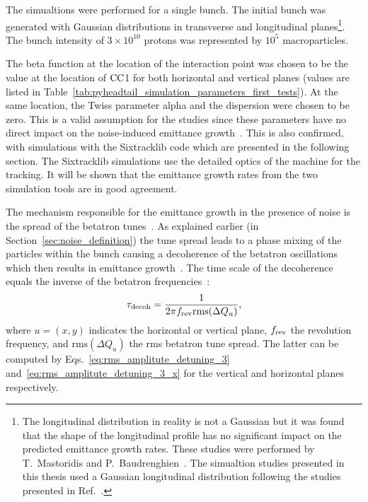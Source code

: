 The simualtions were performed for a single bunch. The initial bunch was generated with Gaussian distributions in transvserse and longitudinal planes\footnote{The longitudinal distribution in reality is not a Gaussian but it was found that the shape of the longitudinal profile has no significant impact on the predicted emittance growth rates. These studies were performed by T.~Mastoridis and P.~Baudrenghien~\cite{Themis_philippe_personal_communication}. The simualtion studies presented in this thesis used a Gaussian longitudinal distribution following the studies presented in Ref.~\cite{PhysRevSTAB.18.101001}.}.
The bunch intensity of $3\times 10^{10}$ protons was represented by $10^5$ macroparticles. 

The beta function at the location of the interaction point was chosen to be the value at the location of ${\mathrm{CC}}$1 for both horizontal and vertical planes (values are listed in Table~\ref{tab:pyheadtail_simulation_parameters_first_tests}). At the same location, the Twiss parameter alpha and the dispersion were chosen to be zero. This is a valid assumption for the studies since these parameters have no direct impact on the noise-induced emittance growth~\cite{PhysRevSTAB.18.101001}. %
This is also confirmed, with simulations with the Sixtracklib code which are presented in the following section. The Sixtracklib simulations use the detailed optics of the machine for the tracking. It will be shown that the emittance growth rates from the two simulation tools are in good agreement.

The mechanism responsible for the emittance growth in the presence of noise is the spread of the betatron tunes~\cite{Lebedev:248620}. As explained earlier (in Section~\ref{sec:noise_definition}) the tune spread leads to a phase mixing of the particles within the bunch causing a decoherence of the betatron oscillations which then results in emittance growth~\cite{Lebedev:248620}. The time scale of the decoherence equals the inverse of the betatron frequencies~\cite{Lebedev:248620}: %
\begin{equation}\label{eq:decoherence_time}
    \tau_\mathrm{decoh} = \frac{1}{2\pi {f_\mathrm{rev}} \mathrm{rms}(\Delta Q_u)},
\end{equation}
where $u=(x,y)$ indicates the horizontal or vertical plane, ${f_\mathrm{rev}}$ the revolution frequency, and $\mathrm{rms}(\Delta Q_u)$ the rms betatron tune spread. The latter can be computed by Eqs.~\eqref{eq:rms_amplitute_detuning_3} and~\eqref{eq:rms_amplitute_detuning_3_x} for the vertical and horizontal planes respectively.

